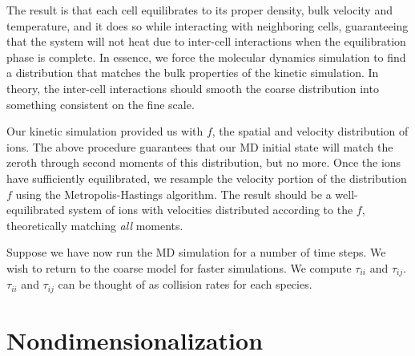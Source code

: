 \documentclass{article}
\begin{document}
The result is that each cell equilibrates to its proper density, bulk velocity and temperature, and it does so while interacting with neighboring cells, guaranteeing that the system will not heat due to inter-cell interactions when the equilibration phase is complete. In essence, we force the molecular dynamics simulation to find a distribution that matches the bulk properties of the kinetic simulation. In theory, the inter-cell interactions should smooth the coarse distribution into something consistent on the fine scale.

Our kinetic simulation provided us with $f$, the spatial and velocity distribution of ions. The above procedure guarantees that our MD initial state will match the zeroth through second moments of this distribution, but no more. Once the ions have sufficiently equilibrated, we resample the velocity portion of the distribution $f$ using the Metropolis-Hastings algorithm. The result should be a well-equilibrated system of ions with velocities distributed according to the $f$, theoretically matching \emph{all} moments.

Suppose we have now run the MD simulation for a number of time steps. We wish to return to the coarse model for faster simulations. We compute $\tau_{ii}$ and $\tau_{ij}$. $\tau_{ii}$ and $\tau_{ij}$ can be thought of as collision rates for each species. 

\section{Nondimensionalization}
\end{document}

